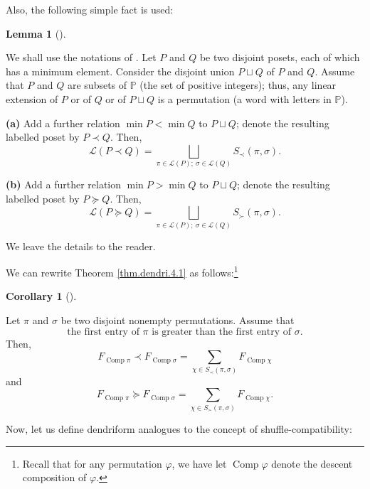 \documentclass[numbers=enddot,12pt,final,onecolumn,notitlepage]{scrartcl}%
\theoremstyle{definition}
\newtheorem{lem}[theo]{Lemma}
\newenvironment{lemma}[1][]
{\begin{lem}[#1]\begin{leftbar}}
{\end{leftbar}\end{lem}}
\newtheorem{coro}[theo]{Corollary}
\newenvironment{corollary}[1][]
{\begin{coro}[#1]\begin{leftbar}}
{\end{leftbar}\end{coro}}
\let\sumnonlimits\sum
\renewcommand{\sum}{\sumnonlimits\limits}
\begin{document}
Also, the following simple fact is used:

\begin{lemma}
\label{lem.dendri.4.1.lem2}We shall use the notations of \cite[Section
5.2]{HopfComb}. Let $P$ and $Q$ be two disjoint posets, each of which has a
minimum element. Consider the disjoint union $P\sqcup Q$ of $P$ and $Q$.
Assume that $P$ and $Q$ are subsets of $\mathbb{P}$ (the set of positive
integers); thus, any linear extension of $P$ or of $Q$ or of $P\sqcup Q$ is a
permutation (a word with letters in $\mathbb{P}$).

\textbf{(a)} Add a further relation $\min P<\min Q$ to $P\sqcup Q$; denote the
resulting labelled poset by $P\left.  \prec\right.  Q$. Then,
\[
\mathcal{L}\left(  P\left.  \prec\right.  Q\right)  =\bigsqcup_{\pi
\in\mathcal{L}\left(  P\right)  ;\ \sigma\in\mathcal{L}\left(  Q\right)
}S_{\prec}\left(  \pi,\sigma\right)  .
\]


\textbf{(b)} Add a further relation $\min P>\min Q$ to $P\sqcup Q$; denote the
resulting labelled poset by $P\left.  \succeq\right.  Q$. Then,
\[
\mathcal{L}\left(  P\left.  \succeq\right.  Q\right)  =\bigsqcup_{\pi
\in\mathcal{L}\left(  P\right)  ;\ \sigma\in\mathcal{L}\left(  Q\right)
}S_{\succ}\left(  \pi,\sigma\right)  .
\]

\end{lemma}

We leave the details to the reader.

We can rewrite Theorem \ref{thm.dendri.4.1} as follows:\footnote{Recall that
for any permutation $\varphi$, we have let $\operatorname*{Comp}\varphi$
denote the descent composition of $\varphi$.}

\begin{corollary}
\label{cor.dendri.4.1}Let $\pi$ and $\sigma$ be two disjoint nonempty
permutations. Assume that%
\[
\text{the first entry of }\pi\text{ is greater than the first entry of }%
\sigma\text{.}%
\]
Then,%
\[
F_{\operatorname*{Comp}\pi}\left.  \prec\right.  F_{\operatorname*{Comp}%
\sigma}=\sum_{\chi\in S_{\prec}\left(  \pi,\sigma\right)  }%
F_{\operatorname*{Comp}\chi}%
\]
and%
\[
F_{\operatorname*{Comp}\pi}\left.  \succeq\right.  F_{\operatorname*{Comp}%
\sigma}=\sum_{\chi\in S_{\succ}\left(  \pi,\sigma\right)  }%
F_{\operatorname*{Comp}\chi}.
\]

\end{corollary}

Now, let us define dendriform analogues to the concept of shuffle-compatibility:
\end{document}
